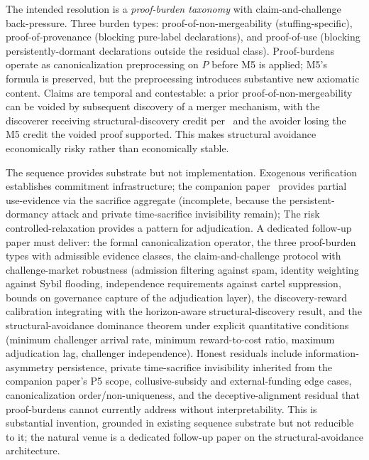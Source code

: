\begin{enumerate}
The intended resolution is a \emph{proof-burden taxonomy} with
        claim-and-challenge back-pressure.  Three burden types:
        proof-of-non-mergeability (stuffing-specific), proof-of-provenance
        (blocking pure-label declarations), and proof-of-use (blocking
        persistently-dormant declarations outside the residual class).
        Proof-burdens operate as canonicalization preprocessing on $P$ before
        M5 is applied; M5's formula is preserved, but the preprocessing
        introduces substantive new axiomatic content.  Claims are temporal and
        contestable: a prior proof-of-non-mergeability can be voided by
        subsequent discovery of a merger mechanism, with the discoverer
        receiving structural-discovery credit
        per~\citep[Proposition~2]{lasser2026horizon} and the avoider losing the
        M5 credit the voided proof supported.  This makes structural avoidance
        economically risky rather than economically stable.

The sequence provides substrate but not implementation.  Exogenous verification
establishes commitment infrastructure; the companion
paper~\citep[Revealed~Sacrifice]{lasser2026paper8a} provides partial
use-evidence via the sacrifice aggregate (incomplete, because the
persistent-dormancy attack and private time-sacrifice invisibility remain); The
risk controlled-relaxation provides a pattern for adjudication.  A dedicated
follow-up paper must deliver: the formal canonicalization operator, the three
proof-burden types with admissible evidence classes, the claim-and-challenge
protocol with challenge-market robustness (admission filtering against spam,
identity weighting against Sybil flooding, independence requirements against
cartel suppression, bounds on governance capture of the adjudication layer),
the discovery-reward calibration integrating with the horizon-aware
structural-discovery result, and the structural-avoidance dominance theorem
under explicit quantitative conditions (minimum challenger arrival rate,
minimum reward-to-cost ratio, maximum adjudication lag, challenger
independence).  Honest residuals include information-asymmetry persistence,
private time-sacrifice invisibility inherited from the companion paper's P5
scope, collusive-subsidy and external-funding edge cases, canonicalization
order/non-uniqueness, and the deceptive-alignment residual that proof-burdens
cannot currently address without interpretability.  This is substantial
invention, grounded in existing sequence substrate but not reducible to it; the
natural venue is a dedicated follow-up paper on the structural-avoidance
architecture.


\end{enumerate}
